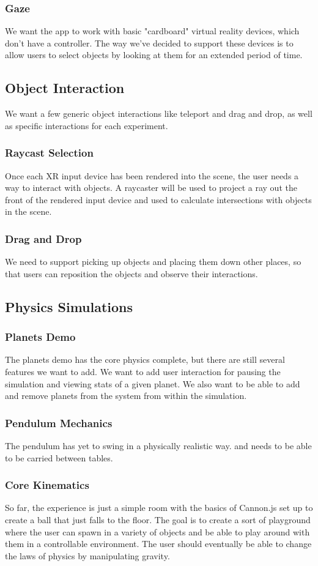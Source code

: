 \documentclass[onecolumn, draftclsnofoot,10pt, compsoc]{IEEEtran}
\begin{document}
\subsubsection{Gaze}
We want the app to work with basic "cardboard" virtual reality devices, which don't have a controller. The way we've decided to support these devices is to allow users to select objects by looking at them for an extended period of time. 
\subsection{Object Interaction}
We want a few generic object interactions like teleport and drag and drop, as well as specific interactions for each experiment.
\subsubsection{Raycast Selection}
Once each XR input device has been rendered into the scene, the user needs a way to interact with objects. A raycaster will be used to project a ray out the front of the rendered input device and used to calculate intersections with objects in the scene.
\subsubsection{Drag and Drop}
We need to support picking up objects and placing them down other places, so that users can reposition the objects and observe their interactions. 
\subsection{Physics Simulations}
\subsubsection{Planets Demo}
The planets demo has the core physics complete, but there are still several features we want to add. We want to add user interaction for pausing the simulation and viewing stats of a given planet. We also want to be able to add and remove planets from the system from within the simulation.
\subsubsection{Pendulum Mechanics}
The pendulum has yet to swing in a physically realistic way.  and needs to be able to be carried between tables.
\subsubsection{Core Kinematics}
So far, the experience is just a simple room with the basics of Cannon.js set up to create a ball that just falls to the floor. The goal is to create a sort of playground where the user can spawn in a variety of objects and be able to play around with them in a controllable environment. The user should eventually be able to change the laws of physics by manipulating gravity.
\end{document}

